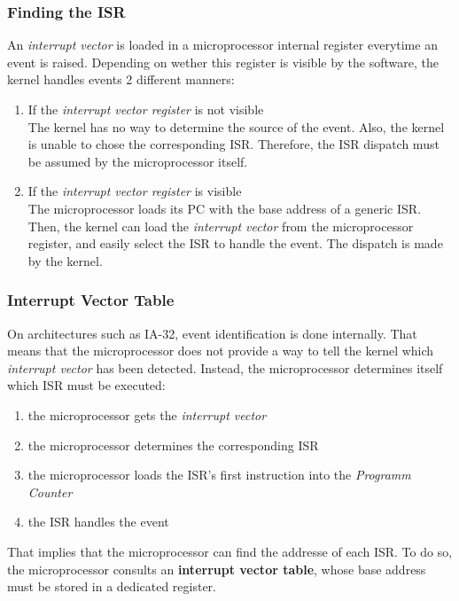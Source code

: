 \begin{frame}
  \frametitle{Finding the ISR}

  An {\em interrupt vector} is loaded in a microprocessor internal register
  everytime an event is raised. Depending on wether this register is visible
  by the software, the kernel handles events 2 different manners:

  \-

  \begin{enumerate}
    \item If the {\em interrupt vector register} is not visible\\
      The kernel has no way to determine the source of the event. Also, the
      kernel is unable to chose the corresponding ISR. Therefore, the ISR
      dispatch must be assumed by the microprocessor itself.

      \-

    \item If the {\em interrupt vector register} is visible\\
      The microprocessor loads its PC with the base address of a generic ISR.
      Then, the kernel can load the {\em interrupt vector} from the
      microprocessor register, and easily select the ISR to handle the event.
      The dispatch is made by the kernel.
  \end{enumerate}

\end{frame}


%
%
%

\begin{frame}
  \frametitle{Interrupt Vector Table}

  On architectures such as IA-32, event identification is done internally. That
  means that the microprocessor does not provide a way to tell the kernel which
  {\em interrupt vector} has been detected. Instead, the microprocessor
  determines itself which ISR must be executed:

  \-

  \begin{enumerate}
    \item the microprocessor gets the {\em interrupt vector}
    \item the microprocessor determines the corresponding ISR
    \item the microprocessor loads the ISR's first instruction into the
      {\em Programm Counter}
    \item the ISR handles the event
  \end{enumerate}

  \-

  That implies that the microprocessor can find the addresse of each ISR. To do
  so, the microprocessor consults an {\bf interrupt vector table}, whose base
  address must be stored in a dedicated register.

\end{frame}

